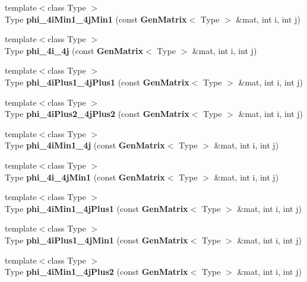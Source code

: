 \begin{DoxyCompactItemize}
\item 
{\footnotesize template$<$class Type $>$ }\\Type {\bfseries phi\_\-4iMin1\_\-4jMin1} (const {\bf GenMatrix}$<$ Type $>$ \&mat, int i, int j)\label{namespaceUCBspl_af1bde4fd16b8f8a33c2bc3083b31a17a}

\item 
{\footnotesize template$<$class Type $>$ }\\Type {\bfseries phi\_\-4i\_\-4j} (const {\bf GenMatrix}$<$ Type $>$ \&mat, int i, int j)\label{namespaceUCBspl_a48fe39d0b87b61d5b99b5877aeb1a97b}

\item 
{\footnotesize template$<$class Type $>$ }\\Type {\bfseries phi\_\-4iPlus1\_\-4jPlus1} (const {\bf GenMatrix}$<$ Type $>$ \&mat, int i, int j)\label{namespaceUCBspl_a016a7861e36dd750acb7f59655edc2f0}

\item 
{\footnotesize template$<$class Type $>$ }\\Type {\bfseries phi\_\-4iPlus2\_\-4jPlus2} (const {\bf GenMatrix}$<$ Type $>$ \&mat, int i, int j)\label{namespaceUCBspl_a7fd47c2a867fcbd29d593d6f9587b7b8}

\item 
{\footnotesize template$<$class Type $>$ }\\Type {\bfseries phi\_\-4iMin1\_\-4j} (const {\bf GenMatrix}$<$ Type $>$ \&mat, int i, int j)\label{namespaceUCBspl_a9b2ccc036d8f57caa94fcf22271cd1b6}

\item 
{\footnotesize template$<$class Type $>$ }\\Type {\bfseries phi\_\-4i\_\-4jMin1} (const {\bf GenMatrix}$<$ Type $>$ \&mat, int i, int j)\label{namespaceUCBspl_ae833bd581041b6029a1d8b5db138de18}

\item 
{\footnotesize template$<$class Type $>$ }\\Type {\bfseries phi\_\-4iMin1\_\-4jPlus1} (const {\bf GenMatrix}$<$ Type $>$ \&mat, int i, int j)\label{namespaceUCBspl_ad7651f7bc5a38f8602e48c1c240c8ffb}

\item 
{\footnotesize template$<$class Type $>$ }\\Type {\bfseries phi\_\-4iPlus1\_\-4jMin1} (const {\bf GenMatrix}$<$ Type $>$ \&mat, int i, int j)\label{namespaceUCBspl_a86a9dcee7f0aa43b4abf85d718c04f20}

\item 
{\footnotesize template$<$class Type $>$ }\\Type {\bfseries phi\_\-4iMin1\_\-4jPlus2} (const {\bf GenMatrix}$<$ Type $>$ \&mat, int i, int j)\label{namespaceUCBspl_ae5d505991e2c65a4da13c0155142c9b2}


\end{DoxyCompactItemize}
